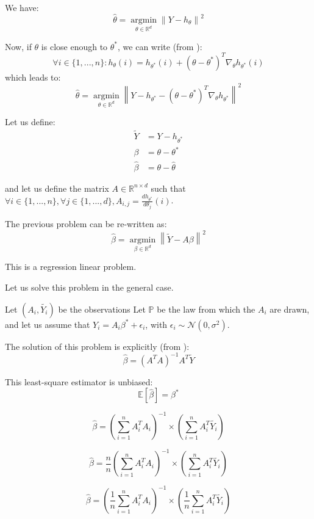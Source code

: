 We have:
\[
\hat{\theta} =  \underset{\theta \in \mathbb{R}^d}{\operatorname{argmin}}  \left\lVert Y - h_\theta \right\rVert ^2
\]

Now, if $\theta$ is close enough to $\theta^*$, we can write (from \cite*{ruckstuhl2010introduction}):
\[
\forall i \in \{ 1, ..., n\} :  h_\theta(i) = h_{\theta^*} (i ) + (\theta - \theta^*)^T\nabla_\theta h_{\theta^*}(i) 
\]
which leads to:
\[
\hat{\theta} =  \underset{\theta \in \mathbb{R}^d}{\operatorname{argmin}}  \left\lVert Y - h_{\theta^*}  - (\theta - \theta^*)^T\nabla_\theta h_{\theta^*}\right\rVert ^2
\]

Let us define:
\begin{align*}
\tilde{Y} &= Y - h_{\theta^*} \\
\beta &= \theta - \theta^* \\
\hat{\beta} &= \theta - \hat{\theta}
\end{align*}

and let us define the matrix $A \in \mathbb{R} ^{n \times d }$ such that $\forall i \in \{ 1, ..., n\}, \forall j \in \{1, ..., d\}, A_{i, j} = \frac{dh_{\theta^*}}{d\theta_j}(i)$.

The previous problem can be re-written as:
\[
\hat{\beta} =  \underset{\beta \in \mathbb{R}^d}{\operatorname{argmin}}  \left\lVert \tilde{Y} - A \beta \right\rVert ^2
\]

This is a regression linear problem.

Let us solve this problem in the general case.

Let $(A_i, \tilde{Y_i})$ be the observations Let $\mathbb{P}$ be the law from which the $A_i$ are drawn, and let us assume that $Y_i = A_i \beta ^* + \epsilon_i $, with $\epsilon_i \sim \mathcal{N}(0, \sigma^2)$.


The solution of this problem is explicitly (from \cite*{powellasymptoticsforleastsquares}):
\[
\hat{\beta } = (A^T A ) ^{-1} A^T \tilde{Y}
\]

This least-square estimator is unbiased:
\[
\mathbb{E}[\hat{\beta}] = \beta^*
\]

\[
\hat {\beta } = \left(  \sum_{i=1}^{n}   A_i ^T A_i \right) ^{-1}    \times \left(  \sum_{i=1}^{n} A_i ^T \tilde{Y_i } \right)
\]

\[
\hat {\beta } =\frac{n}{n} \left(  \sum_{i=1}^{n}   A_i ^T A_i \right) ^{-1}    \times \left(  \sum_{i=1}^{n} A_i ^T \tilde{Y_i } \right)
\]

\[
\hat {\beta } = \left( \frac{1}{n} \sum_{i=1}^{n}   A_i ^T A_i \right) ^{-1}    \times \left( \frac{1}{n} \sum_{i=1}^{n} A_i ^T \tilde{Y_i } \right)
\]

